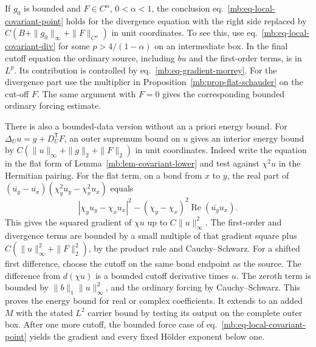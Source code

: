 \documentclass[11pt,letterpaper,reqno]{amsart}
\numberwithin{equation}{section}
\renewcommand{\eqref}[1]{\textup{eq.~\ref{#1}}}
\theoremstyle{definition}
\theoremstyle{remark}
\begin{document}
If \(g_0\) is bounded and \(F\in C^\alpha\), \(0<\alpha<1\),
the conclusion \eqref{mb:eq-local-covariant-point} holds
for the divergence equation with the right side replaced by
\(C(B+\|g_0\|_\infty+\|F\|_{C^\alpha})\) in unit coordinates.
To see this, use \eqref{mb:eq-local-covariant-div} for
some \(p>4/(1-\alpha)\) on an intermediate box. In the final
cutoff equation the ordinary source, including \(bu\) and
the first-order terms, is in \(L^p\). Its contribution is
controlled by \eqref{mb:eq-gradient-morrey}. For the
divergence part use the multiplier in
Proposition~\ref{mb:prop-flat-schauder} on the cut-off \(F\).
The same argument with \(F=0\) gives the corresponding
bounded ordinary forcing estimate.

There is also a bounded-data version without an a priori
energy bound. For \(\Delta_Uu=g+D_U^{\mathsf T}F\), an outer
supremum bound on \(u\) gives an interior energy bound by
\(C(\|u\|_\infty+\|g\|_2+\|F\|_2)\) in unit coordinates.
Indeed write the equation in the flat form of
Lemma~\ref{mb:lem-covariant-lower} and test against \(\chi^2u\)
in the Hermitian pairing. For the flat term, on a bond from
\(x\) to \(y\), the real part of
\((\overline{u_y}-\overline{u_x})(\chi_y^2u_y-\chi_x^2u_x)\)
equals
\[
 |\chi_yu_y-\chi_xu_x|^2
                     -(\chi_y-\chi_x)^2\operatorname{Re}(\overline{u_y}u_x).
\]
This gives the squared gradient of \(\chi u\) up to
\(C\|u\|_\infty^2\).
The first-order and divergence terms are bounded by a
small multiple of that gradient square plus
\(C(\|u\|_\infty^2+\|F\|_2^2)\), by the product rule
and Cauchy--Schwarz. For a shifted first difference,
choose the cutoff on the same bond endpoint as the source.
The difference from \(d(\chi u)\) is a bounded cutoff derivative
times \(u\). The zeroth term is bounded by
\(\|b\|_1\|u\|_\infty^2\), and the ordinary forcing by
Cauchy--Schwarz. This proves the energy bound for real or
complex coefficients. It extends to an added \(M\) with
the stated \(L^2\) carrier bound by testing its output on
the complete outer box. After one more cutoff, the bounded
force case of \eqref{mb:eq-local-covariant-point} yields
the gradient and every fixed H\"older exponent below one.
\end{document}
